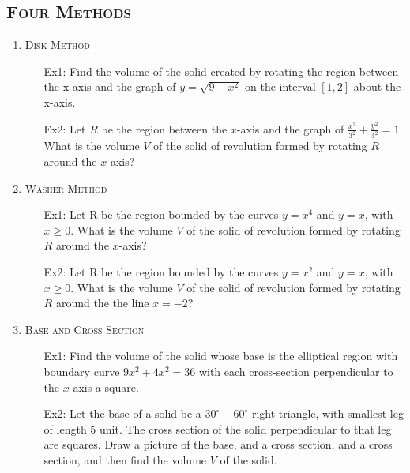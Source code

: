 \documentclass[12pt]{amsart}
\theoremstyle{plain}
\theoremstyle{definition}
\begin{document}
\subsection*{\textsc{Four Methods}} 
\begin{enumerate}            
\item \textsc{Disk Method}
    \begin{itemize}
    \setlength{\itemsep}{200pt}
    \item[Ex1:] Find the volume of the solid created by rotating the region between the x-axis and the graph of $y=\sqrt{9 - x^2}$ on the interval $[1,2]$ about the x-axis. 
    \item[Ex2:] Let $R$ be the region between the $x$-axis and the graph of $\frac{x^2}{3^2} + \frac{y^2}{4^2} = 1$. What is the volume $V$ of the solid of revolution formed by rotating $R$ around the $x$-axis? 
    \item[] 
    \end{itemize}  
\item \textsc{Washer Method} 
    \begin{itemize} 
    \setlength{\itemsep}{200pt} 
    \item[Ex1:] Let R be the region bounded by the curves $y = x^4 $ and $y = x$, with $x\geq 0$. What is the volume $V$ of the solid of revolution formed by rotating $R$ around the $x$-axis?   
    \item[Ex2:]Let R be the region bounded by the curves $y = x^2 $ and $y = x$, with $x\geq 0$. What is the volume $V$ of the solid of revolution formed by rotating $R$ around the the line $x = -2$? 
    \item[] 
    \end{itemize} 

\item \textsc{Base and Cross Section}
    \begin{itemize}
    \setlength{\itemsep}{200pt}
    \item[Ex1:] Find the volume of the solid whose base is the elliptical region with boundary curve $9x^2 + 4x^2 = 36$ with each cross-section perpendicular to the $x$-axis a square.  
    \item[Ex2:] Let the base of a solid be a $30^\circ - 60^\circ$ right triangle, with smallest leg of length 5 unit. The cross section of the solid perpendicular to that leg are squares. Draw a picture of the base, and a cross section, and a cross section, and then find the volume $V$ of the solid. 
    \item[]
    \end{itemize}
    

\end{enumerate}
\end{document}
